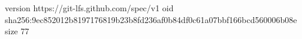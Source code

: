 version https://git-lfs.github.com/spec/v1
oid sha256:9ec852012b8197176819b23b8fd236af0b84df0c61a07bbf166bcd560006b08e
size 77
